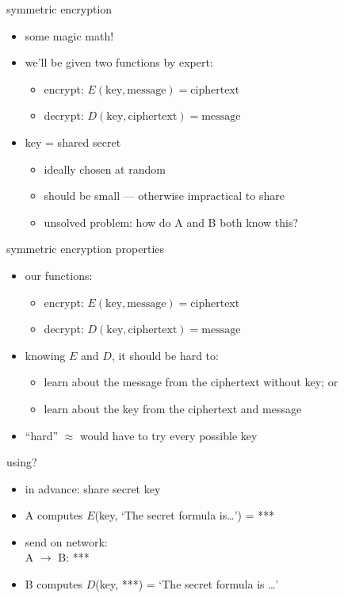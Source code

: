 \begin{frame}{symmetric encryption}
    \begin{itemize}
    \item some magic math!
    \vspace{.5cm}
    \item we'll be given two functions by expert:
        \begin{itemize}
        \item encrypt: $E(\text{key}, \text{message}) = \text{ciphertext}$
        \item decrypt: $D(\text{key}, \text{ciphertext}) = \text{message}$
        \end{itemize}
    \item key = shared secret
        \begin{itemize}
        \item ideally chosen at random
        \item should be small --- otherwise impractical to share
        \item unsolved problem: how do A and B both know this?
        \end{itemize}
    \end{itemize}
\end{frame}

\begin{frame}{symmetric encryption properties}
    \begin{itemize}
    \item our functions:
        \begin{itemize}
        \item encrypt: $E(\text{key}, \text{message}) = \text{ciphertext}$
        \item decrypt: $D(\text{key}, \text{ciphertext}) = \text{message}$
        \end{itemize}
    \item knowing $E$ and $D$, it should be hard to:
        \begin{itemize}
        \item learn about the message from the ciphertext without key; or
        \item learn about the key from the ciphertext and message
        \end{itemize}
    \item ``hard'' $\approx$ would have to try every possible key
    \end{itemize}
\end{frame}

\begin{frame}{using?}
    \begin{itemize}
    \item in advance: share secret key
    \vspace{.5cm}
    \item A computes $E$(key, `The secret formula is\ldots') = ***
    \item send on network: \\
    A $\rightarrow$ B: ***
    \item B computes $D$(key, ***) = `The secret formula is \ldots'
    \end{itemize}
\end{frame}
